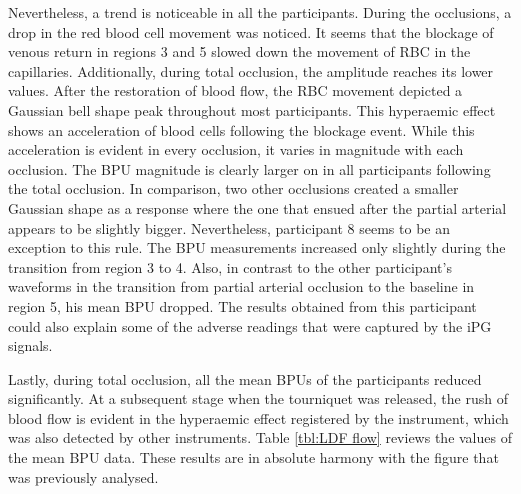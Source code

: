 Nevertheless, a trend is noticeable in all the participants. During the occlusions, a drop in the red blood cell movement was noticed. It seems that the blockage of venous return in regions 3 and 5 slowed down the movement of RBC in the capillaries. Additionally, during total occlusion, the amplitude reaches its lower values. After the restoration of blood flow, the RBC movement depicted a Gaussian bell shape peak throughout most participants. This hyperaemic effect shows an acceleration of blood cells following the blockage event. While this acceleration is evident in every occlusion, it varies in magnitude with each occlusion. The BPU magnitude is clearly larger on in all participants following the total occlusion. In comparison, two other occlusions created a smaller Gaussian shape as a response where the one that ensued after the partial arterial appears to be slightly bigger. Nevertheless, participant 8 seems to be an exception to this rule. The BPU measurements increased only slightly during the transition from region 3 to 4. Also, in contrast to the other participant's waveforms in the transition from partial arterial occlusion to the baseline in region 5, his mean BPU dropped. The results obtained from this participant could also explain some of the adverse readings that were captured by the iPG signals.

Lastly, during total occlusion, all the mean BPUs of the participants reduced significantly. At a subsequent stage when the tourniquet was released, the rush of blood flow is evident in the hyperaemic effect registered by the instrument, which was also detected by other instruments. Table \ref{tbl:LDF flow} reviews the values of the mean BPU data. These results are in absolute harmony with the figure that was previously analysed.

